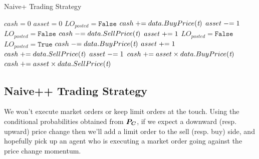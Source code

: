 \begin{algorithm}[H]
\caption{Naive+ Trading Strategy}
\begin{algorithmic}[1]
\State $cash = 0$
\State $asset = 0$
\State $LO_{posted} = \texttt{False}$
		\State $cash \mathrel{+}= data.BuyPrice(\textit{t})$
		\State $asset \mathrel{-}= 1$
		\State $LO_{posted} = \texttt{False}$
		\State $cash \mathrel{-}= data.SellPrice(\textit{t})$	
		\State $asset \mathrel{+}= 1$
		\State $LO_{posted} = \texttt{False}$
		\State $LO_{posted} = \texttt{True}$
	\EndIf
				\State $cash \mathrel{-}= data.BuyPrice(\textit{t})$	
				\State $asset \mathrel{+}= 1$
				\State $cash \mathrel{+}= data.SellPrice(\textit{t})$
				\State $asset \mathrel{-}= 1$
			\EndIf
		\EndFor
	\EndIf
\EndFor
{} 
\State $cash \mathrel{+}= asset \times data.BuyPrice(\textit{t})$
\State $cash \mathrel{+}= asset \times data.SellPrice(\textit{t})$	
\EndIf
\end{algorithmic}
\end{algorithm}

\subsection{Naive++ Trading Strategy} We won't execute market orders or keep limit orders at the touch. Using the conditional probabilities obtained from $\boldsymbol{P_C}$, if we expect a downward (resp. upward) price change then we'll add a limit order to the sell (resp. buy) side, and hopefully pick up an agent who is executing a market order going against the price change momentum. 

